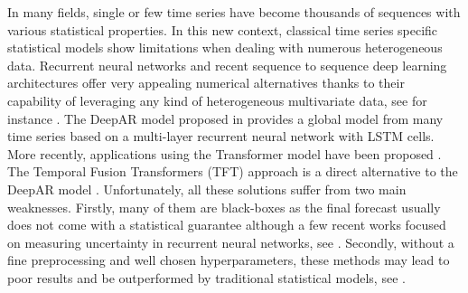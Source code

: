 \documentclass[review]{elsarticle}
\begin{document}
In many fields, single or few time series have become thousands of sequences with various statistical properties. In this new context, classical time series specific statistical models show limitations when dealing with numerous heterogeneous data. Recurrent neural networks and recent sequence to sequence deep learning architectures offer very appealing numerical alternatives thanks to their capability of leveraging any kind of heterogeneous multivariate data, see for instance \cite{ hochreiter1997,vaswani2017, siami2018, li2019, lim2019,salinas2020}. The DeepAR model proposed in \cite{salinas2020} provides a global model from many time series based on a multi-layer recurrent neural network with LSTM cells. More recently, applications using the Transformer model have been proposed  \cite{li2019}. The Temporal Fusion Transformers (TFT) approach is a direct alternative to the DeepAR model \cite{lim2019}.  Unfortunately, all these solutions suffer from two main weaknesses. Firstly, many of them are black-boxes  as the final forecast usually does not come with a statistical guarantee  although a few recent works focused on measuring uncertainty in recurrent neural networks, see  \cite{martin2020}. Secondly, without a fine preprocessing and well chosen hyperparameters, these methods may lead to poor results and be outperformed by traditional statistical models, see \cite{makridakis2018}.
\end{document}

